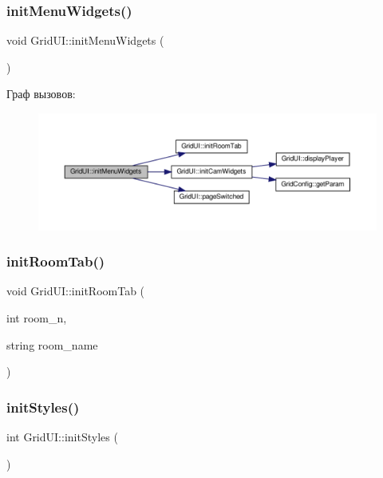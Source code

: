 \subsubsection{\texorpdfstring{init\+Menu\+Widgets()}{initMenuWidgets()}}
{\footnotesize\ttfamily void Grid\+U\+I\+::init\+Menu\+Widgets (\begin{DoxyParamCaption}{ }\end{DoxyParamCaption})\hspace{0.3cm}{\ttfamily [private]}}

Граф вызовов\+:\nopagebreak
\begin{figure}[H]
\begin{center}
\leavevmode
\includegraphics[width=350pt]{class_grid_u_i_ae8dc93dea42ac08339f9e5b774ca9af4_cgraph}
\end{center}
\end{figure}
\mbox{\label{class_grid_u_i_aff8b9292dc0c25bd03ae543738859a26}} 
\subsubsection{\texorpdfstring{init\+Room\+Tab()}{initRoomTab()}}
{\footnotesize\ttfamily void Grid\+U\+I\+::init\+Room\+Tab (\begin{DoxyParamCaption}\item[{int}]{room\+\_\+n,  }\item[{string}]{room\+\_\+name }\end{DoxyParamCaption})\hspace{0.3cm}{\ttfamily [private]}}

\mbox{\label{class_grid_u_i_a14fa8dea460f6fe6fed54e8f267ecd4e}} 
\subsubsection{\texorpdfstring{init\+Styles()}{initStyles()}}
{\footnotesize\ttfamily int Grid\+U\+I\+::init\+Styles (\begin{DoxyParamCaption}{ }\end{DoxyParamCaption})\hspace{0.3cm}{\ttfamily [private]}}

